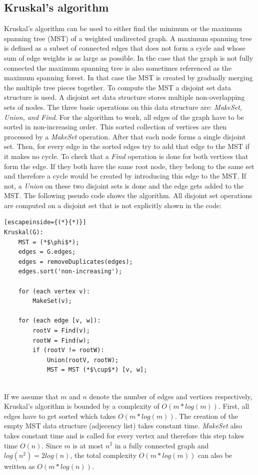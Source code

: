 \documentclass{article}
\begin{document}
\subsection{Kruskal's algorithm}
Kruskal's algorithm can be used to either find the minimum or the maximum spanning tree (MST) of a weighted undirected graph. A maximum spanning tree is defined as a subset of connected edges that does not form a cycle and whose sum of edge weights is as large as possible. In the case that the graph is not fully connected the maximum spanning tree is also sometimes referenced as the maximum spanning forest. In that case the MST is created by gradually merging the multiple tree pieces together. 
To compute the MST a disjoint set data structure is used. A disjoint set data structure stores multiple non-overlapping sets of nodes. The three basic operations on this data structure are: \textit{MakeSet, Union, and Find}. 
For the algorithm to work, all edges of the graph have to be sorted in non-increasing order. This sorted collection of vertices are then processed by a \textit{MakeSet} operation. After that each node forms a single disjoint set. Then, for every edge in the sorted edges try to add that edge to the MST if it makes no cycle. To check that a \textit{Find} operation is done for both vertices that form the edge. If they both have the same root node, they belong to the same set and therefore a cycle would be created by introducing this edge to the MST. If not, a \textit{Union} on these two disjoint sets is done and the edge gets added to the MST. The following pseudo code shows the algorithm. All disjoint set operations are computed on a disjoint set that is not explicitly shown in the code:\\

\begin{lstlisting}[escapeinside={(*}{*)}]
Kruskal(G):
	MST = (*$\phi$*);
	edges = G.edges;
	edges = removeDuplicates(edges);
	edges.sort('non-increasing');
	
	for (each vertex v):
		MakeSet(v);

	for (each edge [v, w]):
		rootV = Find(v);
		rootW = Find(w);
		if (rootV != rootW):
			Union(rootV, rootW);
			MST = MST (*$\cup$*) [v, w];
			
\end{lstlisting}

If we assume that $m$ and $n$ denote the number of edges and vertices respectively, Kruskal's algorithm is bounded by a complexity of $O(m * log(m))$. First, all edges have to get sorted which takes $O(m * log(m))$. The creation of the empty MST data structure (adjecency list) takes constant time. \textit{MakeSet} also takes constant time and is called for every vertex and therefore this step takes time $O(n)$. Since $m$ is at most $n^2$ in a fully connected graph and $log(n^2) = 2log(n)$, the total complexity $O(m * log(m))$ can also be written as $O(m * log(n))$.
\end{document}
